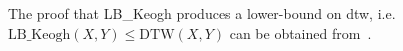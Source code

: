 The proof that LB\_Keogh produces a lower-bound on \gls{dtw}, i.e.~$\mathrm{LB\_Keogh}(X,Y) \leq \mathrm{DTW}(X,Y)$ can be obtained from~\cite{Keogh2004}.

%
%
%
%
%


